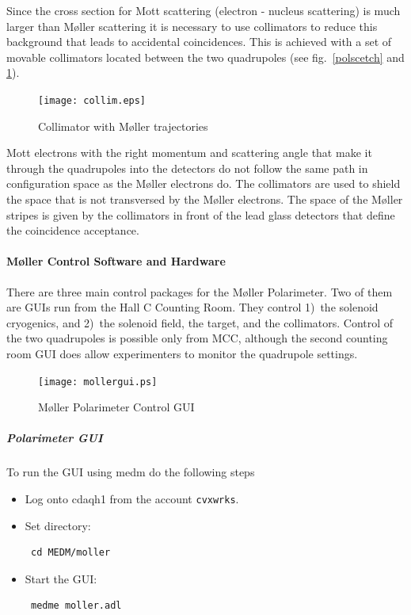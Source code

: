 Since the cross section for Mott scattering (electron - nucleus
scattering) is much larger than M\o ller scattering it is necessary
to use collimators to reduce this background that leads to accidental
coincidences. This is achieved with a set of movable collimators
located between the two quadrupoles (see fig.~\ref{polscetch} 
and \ref{colscetch}). 
%
\begin{figure}
\texttt{[image: collim.eps]}
\begin{center}
\caption{Collimator with M\o ller trajectories\label{colscetch}}
\end{center}
\end{figure}
Mott electrons with the right momentum and scattering angle that make it
through the quadrupoles into the detectors do not follow the same
path in configuration space as 
the M\o ller electrons do.  The collimators are used to shield the
space that is not transversed by the M\o ller electrons. The space of
the M\o ller stripes is  
given by the collimators in front of the lead glass detectors
that define the coincidence acceptance.
%

\paragraph{M\o ller Control Software and Hardware}
There are three main control packages for the M\o ller Polarimeter.
Two of them are GUIs run from the Hall C Counting Room. They
control 1)~the solenoid cryogenics, and 2)~the solenoid field, 
the target, and the collimators. Control of the two quadrupoles
is possible only from MCC, although the second counting room GUI does
allow experimenters to monitor the quadrupole settings.


\begin{figure}
  \begin{center}
  \texttt{[image: mollergui.ps]}
  \caption{M\o ller Polarimeter Control GUI\label{molpolmedm}}
  \end{center}
\end{figure}
%

\subparagraph{Polarimeter GUI}

To run the GUI using medm do the following steps
\begin{itemize}
\item Log onto cdaqh1 from the account {\tt cvxwrks}.
\item Set directory: \begin{verbatim} cd MEDM/moller \end{verbatim}
\item Start the GUI: \begin{verbatim} medme moller.adl  \end{verbatim} 
\end{itemize}
%

